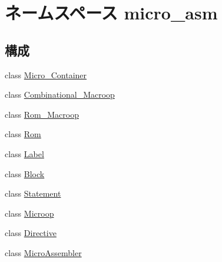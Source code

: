 \hypertarget{namespacemicro__asm}{
\section{ネームスペース micro\_\-asm}
\label{namespacemicro__asm}
}
\subsection*{構成}
\begin{DoxyCompactItemize}
\item 
class \hyperlink{classmicro__asm_1_1Micro__Container}{Micro\_\-Container}
\item 
class \hyperlink{classmicro__asm_1_1Combinational__Macroop}{Combinational\_\-Macroop}
\item 
class \hyperlink{classmicro__asm_1_1Rom__Macroop}{Rom\_\-Macroop}
\item 
class \hyperlink{classmicro__asm_1_1Rom}{Rom}
\item 
class \hyperlink{classmicro__asm_1_1Label}{Label}
\item 
class \hyperlink{classmicro__asm_1_1Block}{Block}
\item 
class \hyperlink{classmicro__asm_1_1Statement}{Statement}
\item 
class \hyperlink{classmicro__asm_1_1Microop}{Microop}
\item 
class \hyperlink{classmicro__asm_1_1Directive}{Directive}
\item 
class \hyperlink{classmicro__asm_1_1MicroAssembler}{MicroAssembler}
\end{DoxyCompactItemize}
